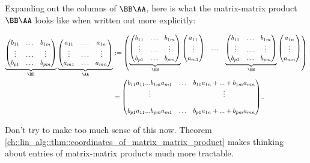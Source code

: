 \begin{remark}
    Expanding out the columns of $\BB \AA$, here is what the matrix-matrix product $\BB \AA$ looks like when written out more explicitly:
    
    \begin{align*}
        \underbrace
        {\begin{pmatrix} 
            b_{11} & \hdots & b_{1m} \\
            \vdots & \hdots & \vdots \\
            b_{p1} & \hdots & b_{pm}
        \end{pmatrix}}_\BB
        \underbrace
        {\begin{pmatrix} 
            a_{11} & \hdots & a_{1n} \\
            \vdots & \hdots & \vdots \\
            a_{m1} & \hdots & a_{mn}
        \end{pmatrix}}_\AA
        &:=
        \begin{pmatrix}
            \underbrace
            {\begin{pmatrix} 
                b_{11} & \hdots & b_{1m} \\
                \vdots & \hdots & \vdots \\
                b_{p1} & \hdots & b_{pm}
            \end{pmatrix}}_\BB
            \begin{pmatrix} a_{11} \\ \vdots \\ a_{m1} \end{pmatrix}
            &
            \hdots
            &
            \underbrace
            {\begin{pmatrix} 
                b_{11} & \hdots & b_{1m} \\
                \vdots & \hdots & \vdots \\
                b_{p1} & \hdots & b_{pm}
            \end{pmatrix}}_\BB
            \begin{pmatrix} a_{1n} \\ \vdots \\ a_{mn} \end{pmatrix}
        \end{pmatrix} \\
        &=
        \begin{pmatrix}
            b_{11} a_{11} ... b_{1m} a_{m1} &
            \hdots
            &
            b_{11} a_{1n} + ... + b_{1m} a_{mn}
            \\
            \vdots & & \vdots \\
            \\
            b_{p1} a_{11} ... b_{pm} a_{m1} &
            \hdots & b_{p1} a_{1n} + ... + b_{pm} a_{mn}
        \end{pmatrix}.
    \end{align*}
    
    Don't try to make too much sense of this now. Theorem \ref{ch::lin_alg::thm::coordinates_of_matrix_matrix_product} makes thinking about entries of matrix-matrix products much more tractable.
\end{remark}

